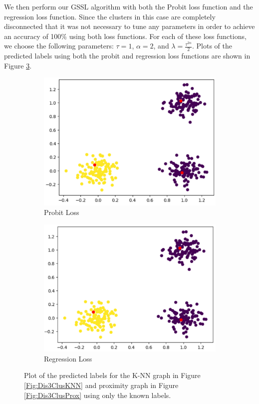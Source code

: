 \documentclass[12pt]{amsart}
\begin{document}
We then perform our GSSL algorithm with both the Probit loss function and the regression loss function. Since the clusters in this case are completely disconnected that it was not necessary to tune any parameters in order to achieve an accuracy of 100\% using both loss functions. For each of these loss functions, we choose the following parameters: $\tau=1$, $\alpha=2$, and $\lambda=\frac{\tau^{2\alpha}}{2}$. Plots of the predicted labels using both the probit and regression loss functions are shown in Figure \ref{Fig:Dis3ClusKNNRes}.

    \begin{figure}[ht] 
  \begin{subfigure}{0.475\linewidth}
    \centering
    \includegraphics[width=0.8\linewidth]{Figures/Dis3ClusKNNPro.png} 
    \caption{Probit Loss} 
    \label{Fig:Dis3ClusKNNPro} 
  \end{subfigure}%
  \begin{subfigure}{0.475\linewidth}
    \centering
    \includegraphics[width=0.8\linewidth]{Figures/Dis3ClusKNNReg.png} 
    \caption{Regression Loss} 
    \label{Fig:Dis3ClusKNNReg} 
  \end{subfigure} 
  \caption{Plot of the predicted labels for the K-NN graph in Figure \ref{Fig:Dis3ClusKNN} and proximity graph in Figure \ref{Fig:Dis3ClusProx}
  using only the known labels.}
  \label{Fig:Dis3ClusKNNRes}
\end{figure}
\end{document}
